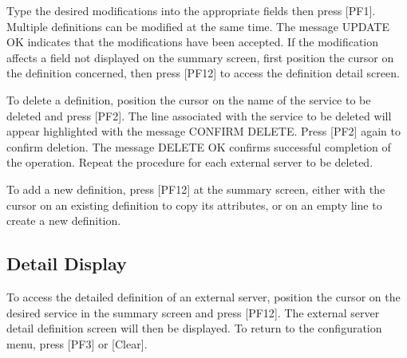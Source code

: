 \documentclass[letterpaper,10pt,english]{sphinxmanual}
\begin{document}
\sphinxAtStartPar
{} \sphinxhyphen{} Type the desired modifications into the appropriate fields then press {[}PF1{]}. Multiple definitions can be modified at the same time. The message UPDATE OK indicates that the modifications have been accepted. If the modification affects a field not displayed on the summary screen, first position the cursor on the definition concerned, then press {[}PF12{]} to access the definition detail screen.

\sphinxAtStartPar
{} \sphinxhyphen{} To delete a definition, position the cursor on the name of the service to be deleted and press {[}PF2{]}. The line associated with the service to be deleted will appear highlighted with the message CONFIRM DELETE. Press {[}PF2{]} again to confirm deletion. The message DELETE OK confirms successful completion of the operation. Repeat the procedure for each external server to be deleted.

\sphinxAtStartPar
{} \sphinxhyphen{} To add a new definition, press {[}PF12{]} at the summary screen, either with the cursor on an existing definition to copy its attributes, or on an empty line to create a new definition.

\ignorespaces 

\subsection{Detail Display}
\label{\detokenize{connectivity_guide:index-136}}\label{\detokenize{connectivity_guide:id72}}
\sphinxAtStartPar
To access the detailed definition of an external server, position the cursor on the desired service in the summary screen and press {[}PF12{]}. The external server detail definition screen will then be displayed. To return to the configuration menu, press {[}PF3{]} or {[}Clear{]}.

\sphinxAtStartPar
{}

\ignorespaces 
\end{document}
